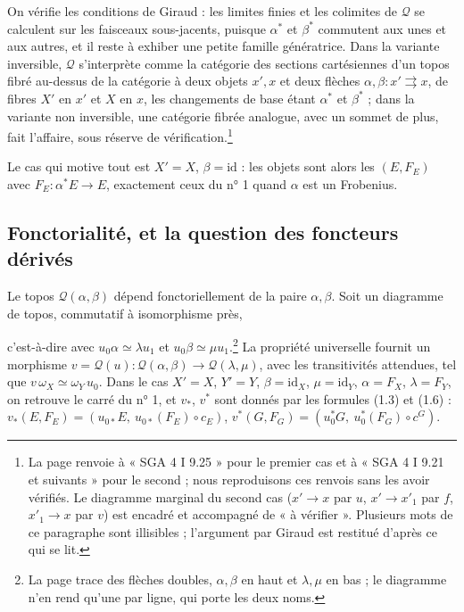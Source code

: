 \documentclass[11pt,a4paper]{article}
\begin{document}
On vérifie les conditions de Giraud : les limites finies et les colimites de
$\mathcal{Q}$ se calculent sur les faisceaux sous-jacents, puisque
$\alpha^{*}$ et $\beta^{*}$ commutent aux unes et aux autres, et il reste à
exhiber une petite famille génératrice. Dans la variante inversible,
$\mathcal{Q}$ s'interprète comme la catégorie des sections cartésiennes d'un
topos fibré au-dessus de la catégorie à deux objets $x', x$ et deux flèches
$\alpha, \beta : x' \rightrightarrows x$, de fibres $X'$ en $x'$ et $X$ en $x$,
les changements de base étant $\alpha^{*}$ et $\beta^{*}$ ; dans la variante
non inversible, une catégorie fibrée analogue, avec un sommet de plus, fait
l'affaire, sous réserve de vérification.\footnote{La page renvoie à « SGA 4
I 9.25 » pour le premier cas et à « SGA 4 I 9.21 et suivants » pour le
second ; nous reproduisons ces renvois sans les avoir vérifiés. Le diagramme
marginal du second cas ($x' \to x$ par $u$, $x' \to x'_1$ par $f$,
$x'_1 \to x$ par $v$) est encadré et accompagné de « à vérifier ». Plusieurs
mots de ce paragraphe sont illisibles ; l'argument par Giraud est restitué
d'après ce qui se lit.}

Le cas qui motive tout est $X' = X$, $\beta = \mathrm{id}$ : les objets sont
alors les $(E, F_E)$ avec $F_E : \alpha^{*}E \to E$, exactement ceux du n° 1
quand $\alpha$ est un Frobenius.

\subsection*{Fonctorialité, et la question des foncteurs dérivés}

Le topos $\mathcal{Q}(\alpha,\beta)$ dépend fonctoriellement de la paire
$\alpha, \beta$. Soit un diagramme de topos, commutatif à isomorphisme près,
c'est-à-dire avec $u_0\alpha \simeq \lambda u_1$ et $u_0\beta \simeq \mu
u_1$.\footnote{La page trace des flèches doubles, $\alpha, \beta$ en haut et
$\lambda, \mu$ en bas ; le diagramme n'en rend qu'une par ligne, qui porte
les deux noms.} La propriété universelle fournit
un morphisme $v = \mathcal{Q}(u) : \mathcal{Q}(\alpha,\beta) \to
\mathcal{Q}(\lambda,\mu)$, avec les transitivités attendues, tel que
$v\,\omega_X \simeq \omega_Y\, u_0$. Dans le cas $X' = X$, $Y' = Y$,
$\beta = \mathrm{id}_X$, $\mu = \mathrm{id}_Y$, $\alpha = F_X$, $\lambda =
F_Y$, on retrouve le carré du n° 1, et $v_*$, $v^{*}$ sont donnés par les
formules (1.3) et (1.6) : $v_*(E, F_E) = (u_{0*}E,\ u_{0*}(F_E) \circ c_E)$,
$v^{*}(G, F_G) = (u_0^{*}G,\ u_0^{*}(F_G)\circ c^{G})$.
\end{document}
